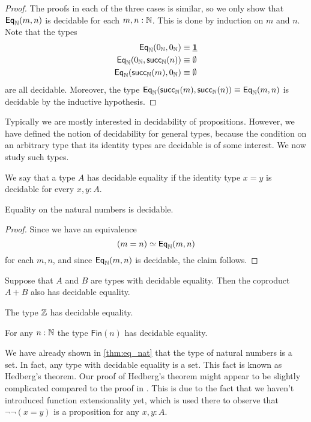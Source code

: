 \begin{proof}
  The proofs in each of the three cases is similar, so we only show that $\mathsf{Eq}_{{\mathbb{N}}}(m,n)$ is decidable for each $m,n:{\mathbb{N}}$. This is done by induction on $m$ and $n$. Note that the types
  \begin{align*}
    \mathsf{Eq}_{{\mathbb{N}}}(0_{{\mathbb{N}}},0_{{\mathbb{N}}}) & \equiv \underline{\mathbf{1}} \\
    \mathsf{Eq}_{{\mathbb{N}}}(0_{{\mathbb{N}}},\mathsf{succ}_{{\mathbb{N}}}(n)) & \equiv \emptyset \\
    \mathsf{Eq}_{{\mathbb{N}}}(\mathsf{succ}_{{\mathbb{N}}}(m),0_{{\mathbb{N}}}) & \equiv \emptyset 
  \end{align*}
  are all decidable. Moreover, the type $\mathsf{Eq}_{{\mathbb{N}}}(\mathsf{succ}_{{\mathbb{N}}}(m),\mathsf{succ}_{{\mathbb{N}}}(n))\equiv \mathsf{Eq}_{{\mathbb{N}}}(m,n)$ is decidable by the inductive hypothesis.
\end{proof}

Typically we are mostly interested in decidability of propositions. However, we have defined the notion of decidability for general types, because the condition on an arbitrary type that its identity types are decidable is of some interest. We now study such types.

\begin{defn}
  We say that a type $A$ has decidable equality if the identity type $x=y$ is decidable for every $x,y:A$. 
\end{defn}

\begin{lem}
  Equality on the natural numbers is decidable.
\end{lem}

\begin{proof}
  Since we have an equivalence
  \begin{equation*}
    (m=n) \simeq \mathsf{Eq}_{\mathbb{N}}(m,n)
  \end{equation*}
  for each $m,n$, and since $\mathsf{Eq}_{\mathbb{N}}(m,n)$ is decidable, the claim follows.
\end{proof}

\begin{lem}
  Suppose that $A$ and $B$ are types with decidable equality. Then the coproduct $A+B$ also has decidable equality.
\end{lem}

\begin{cor}
  The type ${\mathbb{Z}}$ has decidable equality.
\end{cor}

\begin{cor}
  For any $n:{\mathbb{N}}$ the type $\mathsf{Fin}(n)$ has decidable equality. 
\end{cor}

We have already shown in \cref{thm:eq_nat} that the type of natural numbers is a set. In fact, any type with decidable equality is a set. This fact is known as Hedberg's theorem. Our proof of Hedberg's theorem might appear to be slightly complicated compared to the proof in \cite{hottbook}. This is due to the fact that we haven't introduced function extensionality yet, which is used there to observe that $\neg\neg(x=y)$ is a proposition for any $x,y:A$.

